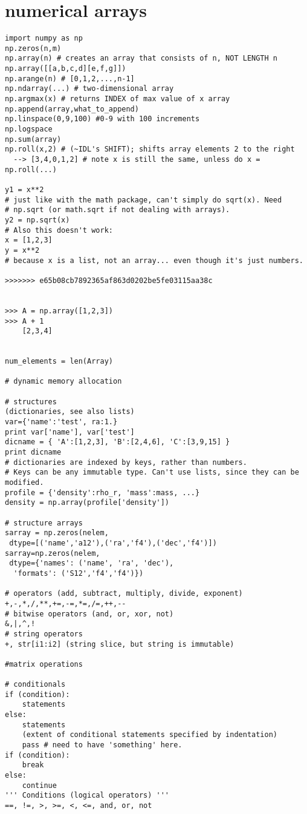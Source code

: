 \documentclass{article}
\begin{document}
\section*{numerical arrays}
\begin{verbatim}
import numpy as np
np.zeros(n,m)
np.array(n) # creates an array that consists of n, NOT LENGTH n
np.array([[a,b,c,d][e,f,g]])
np.arange(n) # [0,1,2,...,n-1]
np.ndarray(...) # two-dimensional array
np.argmax(x) # returns INDEX of max value of x array
np.append(array,what_to_append)
np.linspace(0,9,100) #0-9 with 100 increments
np.logspace
np.sum(array)
np.roll(x,2) # (~IDL's SHIFT); shifts array elements 2 to the right
  --> [3,4,0,1,2] # note x is still the same, unless do x = np.roll(...)

y1 = x**2
# just like with the math package, can't simply do sqrt(x). Need
# np.sqrt (or math.sqrt if not dealing with arrays).
y2 = np.sqrt(x)
# Also this doesn't work:
x = [1,2,3]
y = x**2
# because x is a list, not an array... even though it's just numbers.

>>>>>>> e65b08cb7892365af863d0202be5fe03115aa38c


>>> A = np.array([1,2,3])
>>> A + 1
    [2,3,4]


num_elements = len(Array)

# dynamic memory allocation

# structures
(dictionaries, see also lists)
var={'name':'test', ra:1.}
print var['name'], var['test']
dicname = { 'A':[1,2,3], 'B':[2,4,6], 'C':[3,9,15] }
print dicname
# dictionaries are indexed by keys, rather than numbers.
# Keys can be any immutable type. Can't use lists, since they can be modified.
profile = {'density':rho_r, 'mass':mass, ...}
density = np.array(profile['density'])

# structure arrays
sarray = np.zeros(nelem,
 dtype=[('name','a12'),('ra','f4'),('dec','f4')])
sarray=np.zeros(nelem,
 dtype={'names': ('name', 'ra', 'dec'),
  'formats': ('S12','f4','f4')})

# operators (add, subtract, multiply, divide, exponent)
+,-,*,/,**,+=,-=,*=,/=,++,--
# bitwise operators (and, or, xor, not)
&,|,^,!
# string operators
+, str[i1:i2] (string slice, but string is immutable)

#matrix operations

# conditionals
if (condition):
    statements
else:
    statements
    (extent of conditional statements specified by indentation)
    pass # need to have 'something' here.
if (condition):
    break
else:
    continue
''' Conditions (logical operators) '''
==, !=, >, >=, <, <=, and, or, not
\end{verbatim}
\end{document}
